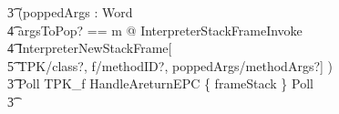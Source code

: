 \begin{figure}[t!]
\begin{circusaction}
    \t3 (\circvar poppedArgs : \seq Word \circspot \\
    \t4 \lschexpract \exists argsToPop? == m @ InterpreterStackFrameInvoke \rschexpract \circseq \\
    \t4 \lschexpract InterpreterNewStackFrame[\\
    \t5 TPK/class?, f/methodID?, poppedArgs/methodArgs?] \rschexpract) \circseq \\
    \t3 Poll \circseq TPK\_f \circseq HandleAreturnEPC \circseq \{ frameStack \neq \emptyset \} \circseq Poll \circseq \\
    \t3 {} \cdots {} \\

\end{circusaction}
\end{figure}
